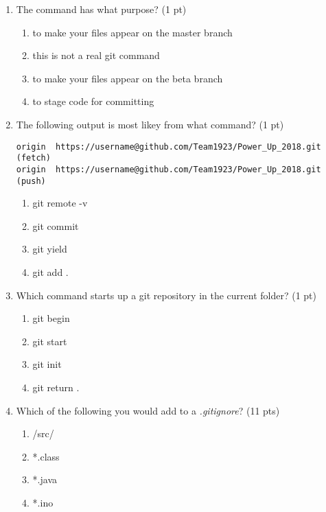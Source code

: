 \documentclass[11pt,fleqn]{article}
\begin{document}
\begin{enumerate}

\item The command  has what purpose? (1 pt)
	\begin{enumerate}
    	\item to make your files appear on the master branch
    	\item this is not a real git command
    	\item to make your files appear on the beta branch
    	\item to stage code for committing
	\end{enumerate}

\item The following output is most likey from what command? (1 pt)
\begin{verbatim}
origin  https://username@github.com/Team1923/Power_Up_2018.git (fetch)
origin  https://username@github.com/Team1923/Power_Up_2018.git (push)
\end{verbatim}

	\begin{enumerate}
    	\item git remote -v
    	\item git commit
    	\item git yield 
    	\item git add .
	\end{enumerate}

\item Which command starts up a git repository in the current folder? (1 pt) %
	\begin{enumerate}
    	\item git begin
    	\item git start
    	\item git init
    	\item git return .
	\end{enumerate}

\newpage

\item Which of the following you would add to a \textit{.gitignore}? (11 pts)
	\begin{enumerate}
    	\item /src/
    	\item *.class
    	\item *.java
    	\item *.ino
	\end{enumerate}


\end{enumerate}
\end{document}
